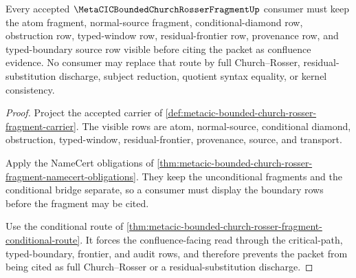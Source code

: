\begin{theorem}
\label{thm:metacic-bounded-church-rosser-fragment-nonescape}
Every accepted $\MetaCICBoundedChurchRosserFragmentUp$ consumer must keep the atom fragment, normal-source fragment, conditional-diamond row, obstruction row, typed-window row, residual-frontier row, provenance row, and typed-boundary source row visible before citing the packet as confluence evidence. No consumer may replace that route by full Church--Rosser, residual-substitution discharge, subject reduction, quotient syntax equality, or kernel consistency.
\end{theorem}
\begin{proof}
Project the accepted carrier of \autoref{def:metacic-bounded-church-rosser-fragment-carrier}. The visible rows are atom, normal-source, conditional diamond, obstruction, typed-window, residual-frontier, provenance, source, and transport.

Apply the NameCert obligations of \autoref{thm:metacic-bounded-church-rosser-fragment-namecert-obligations}. They keep the unconditional fragments and the conditional bridge separate, so a consumer must display the boundary rows before the fragment may be cited.

Use the conditional route of \autoref{thm:metacic-bounded-church-rosser-fragment-conditional-route}. It forces the confluence-facing read through the critical-path, typed-boundary, frontier, and audit rows, and therefore prevents the packet from being cited as full Church--Rosser or a residual-substitution discharge.
\end{proof}



